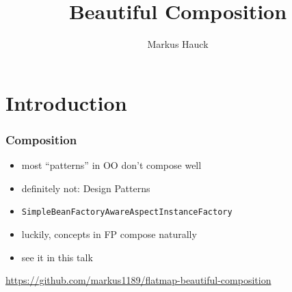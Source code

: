 \documentclass[aspectratio=169]{beamer}
\title{Beautiful Composition}
\author{Markus Hauck}
\begin{document}
\begin{frame}
  \titlepage{}
\end{frame}

\section{Introduction}\label{sec:introduction}

\begin{frame}
  \frametitle{Composition}
  \begin{itemize}
  \item most ``patterns'' in OO don't compose well
  \item definitely not: Design Patterns
  \item \texttt{SimpleBeanFactoryAwareAspectInstanceFactory}
  \item luckily, concepts in FP compose naturally
  \item see it in this talk
  \end{itemize}
  \vfill
  \url{https://github.com/markus1189/flatmap-beautiful-composition}
\end{frame}
\end{document}
